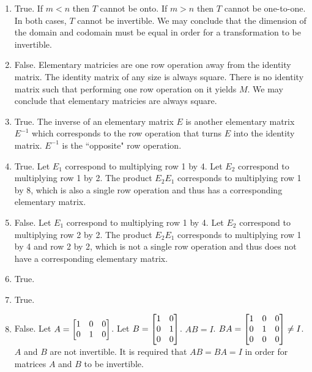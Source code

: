 \begin{exercises}
\begin{problist}
		\begin{solution}
			\begin{enumerate}
				\item True. If $m<n$ then $T$ cannot be onto. If $m>n$ then $T$ cannot be one-to-one. In both cases, $T$ cannot be invertible. We may conclude that the dimension of the domain and codomain must be equal in order for a transformation to be invertible.
				\item False. Elementary matricies are one row operation away from the identity matrix. The identity matrix of any size is always square. There is no identity matrix such that performing one row operation on it yields $M$. We may conclude that elementary matricies are always square.
				\item True. The inverse of an elementary matrix $E$ is another elementary matrix $E^{-1}$ which corresponds to the row operation that turns $E$ into the identity matrix. $E^{-1}$ is the ``opposite" row operation.
				\item True. Let $E_1$ correspond to multiplying row 1 by 4. Let $E_2$ correspond to multiplying row 1 by 2. The product $E_2E_1$ corresponds to multiplying row 1 by 8, which is also a single row operation and thus has a corresponding elementary matrix.
				\item False. Let $E_1$ correspond to multiplying row 1 by 4. Let $E_2$ correspond to multiplying row 2 by 2. The product $E_2E_1$ corresponds to multiplying row 1 by 4 and row 2 by 2, which is not a single row operation and thus does not have a corresponding elementary matrix.
				\item True.
				\item True.
				\item False. Let $A = \mat{1&0&0\\0&1&0}$. Let $B = \mat{1&0\\0&1\\0&0}$. $AB = I$. $BA = \mat{1&0&0\\0&1&0\\0&0&0} \neq I$. $A$ and $B$ are not invertible. It is required that $AB = BA = I$ in order for matrices $A$ and $B$ to be invertible.
			\end{enumerate}
		\end{solution}
	\end{problist}
\end{exercises}
